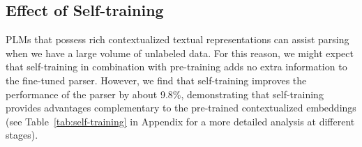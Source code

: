 \documentclass[11pt]{article}
\begin{document}
\begin{table*}[t]
   \centering
    \caption[Recall of constituents by label in (\%)]{{Average recall per constituent category (i.e. label recall) in (\%). The results of PRPN, ON, URNNG, and Compound PCFG are taken from \citet{kim-etal-2019-compound}, S-DIORA from \citet{drozdov-etal-2020-unsupervised}, and Constituency Test from \citet{cao-etal-2020-unsupervised}}.}
    \label{tab:label-recall}
\end{table*} 
\subsection{Effect of Self-training}
\label{ssec:effect-of-selftraining}
PLMs that possess rich contextualized textual representations can assist parsing when we have a large volume of unlabeled data. For this reason, we might expect that self-training in combination with pre-training adds no extra information to the fine-tuned parser. However, we find that self-training improves the performance of the parser by about 9.8\%, demonstrating that self-training provides advantages complementary to the pre-trained contextualized embeddings (see Table~\ref{tab:self-training} in Appendix for a more detailed analysis at different stages).
\end{document}
